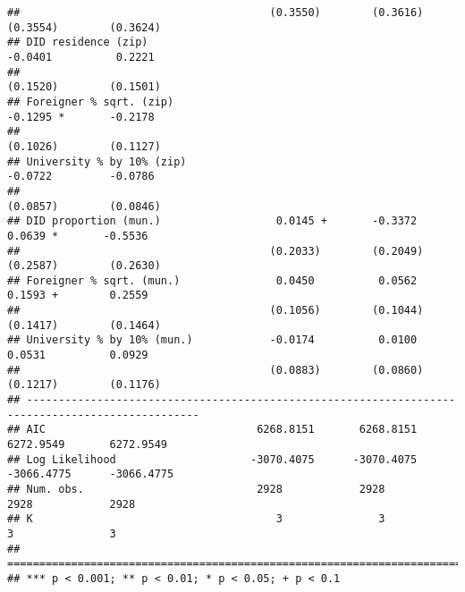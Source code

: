\documentclass[
]{article}
\begin{document}
\begin{verbatim}
##                                       (0.3550)        (0.3616)        (0.3554)        (0.3624)   
## DID residence (zip)                                                   -0.0401          0.2221    
##                                                                       (0.1520)        (0.1501)   
## Foreigner % sqrt. (zip)                                               -0.1295 *       -0.2178    
##                                                                       (0.1026)        (0.1127)   
## University % by 10% (zip)                                             -0.0722         -0.0786    
##                                                                       (0.0857)        (0.0846)   
## DID proportion (mun.)                  0.0145 +       -0.3372          0.0639 *       -0.5536    
##                                       (0.2033)        (0.2049)        (0.2587)        (0.2630)   
## Foreigner % sqrt. (mun.)               0.0450          0.0562          0.1593 +        0.2559    
##                                       (0.1056)        (0.1044)        (0.1417)        (0.1464)   
## University % by 10% (mun.)            -0.0174          0.0100          0.0531          0.0929    
##                                       (0.0883)        (0.0860)        (0.1217)        (0.1176)   
## -------------------------------------------------------------------------------------------------
## AIC                                 6268.8151       6268.8151       6272.9549       6272.9549    
## Log Likelihood                     -3070.4075      -3070.4075      -3066.4775      -3066.4775    
## Num. obs.                           2928            2928            2928            2928         
## K                                      3               3               3               3         
## =================================================================================================
## *** p < 0.001; ** p < 0.01; * p < 0.05; + p < 0.1
\end{verbatim}
\end{document}
